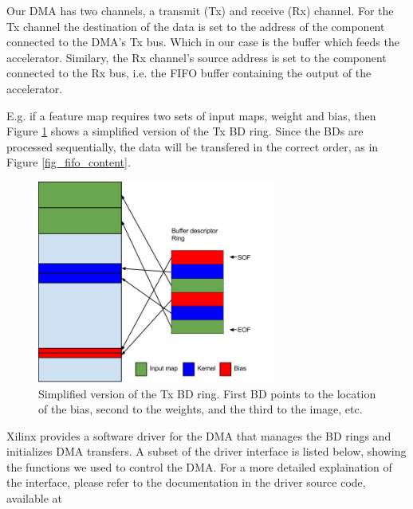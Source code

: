 Our DMA has two channels, a transmit (Tx) and receive (Rx) channel. For the Tx channel the destination of the data is set to the address of the component connected to the DMA's Tx bus. Which in our case is the buffer which feeds the accelerator. Similary, the Rx channel's source address is set to the component connected to the Rx bus, i.e. the FIFO buffer containing the output of the accelerator.

E.g. if a feature map requires two sets of input maps, weight and bias, then Figure \ref{fig_bdring} shows a simplified version of the Tx BD ring. Since the BDs are processed sequentially, the data will be transfered in the correct order, as in Figure \ref{fig_fifo_content}.

\begin{figure}[h!]
  \centering
      \includegraphics[width=0.7\textwidth]{Figures/Method/BdRing}
    \caption{Simplified version of the Tx BD ring. First BD points to the location of the bias, second to the weights, and the third to the image, etc.}
    \label{fig_bdring}
\end{figure}


Xilinx provides a software driver for the DMA that manages the BD rings and initializes DMA transfers. A subset of the driver interface is listed below, showing the functions we used to control the DMA. For a more detailed explaination of the interface, please refer to the documentation in the driver source code, available at \cite{DMA_DRIVER_SOURCE}


